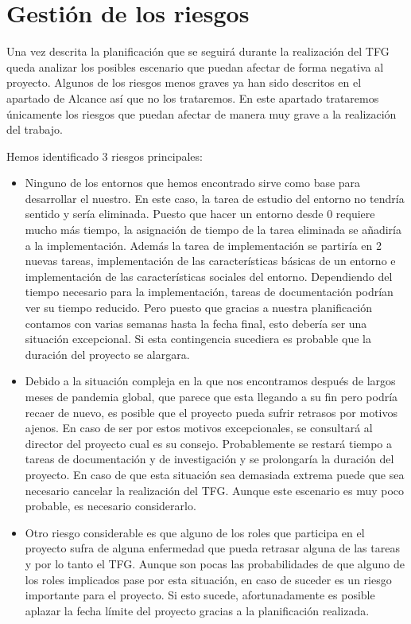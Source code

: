 \section{Gestión de los riesgos}
Una vez descrita la planificación que se seguirá durante la realización del TFG queda analizar los posibles escenario que puedan afectar de forma negativa al proyecto. Algunos de los riesgos menos graves ya han sido descritos en el apartado de Alcance así que no los trataremos. En este apartado trataremos únicamente los riesgos que puedan afectar de manera muy grave a la realización del trabajo.  

Hemos identificado 3 riesgos principales:
\begin{itemize}
    \item Ninguno de los entornos que hemos encontrado sirve como base para desarrollar el nuestro. En este caso, la tarea de estudio del entorno no tendría sentido y sería eliminada. Puesto que hacer un entorno desde 0 requiere mucho más tiempo, la asignación de tiempo de la tarea eliminada se añadiría a la implementación. Además la tarea de implementación se partiría en 2 nuevas tareas, implementación de las características básicas de un entorno e implementación de las características sociales del entorno. Dependiendo del tiempo necesario para la implementación, tareas de documentación podrían ver su tiempo reducido. Pero puesto que gracias a nuestra planificación contamos con varias semanas hasta la fecha final, esto debería ser una situación excepcional. Si esta contingencia sucediera es probable que la duración del proyecto se alargara.
    
    \item Debido a la situación compleja en la que nos encontramos después de largos meses de pandemia global, que parece que esta llegando a su fin pero podría recaer de nuevo, es posible que el proyecto pueda sufrir retrasos por motivos ajenos. En caso de ser por estos motivos excepcionales, se consultará al director del proyecto cual es su consejo. Probablemente se restará tiempo a tareas de documentación y de investigación y se prolongaría la duración del proyecto. En caso de que esta situación sea demasiada extrema puede que sea necesario cancelar la realización del TFG. Aunque este escenario es muy poco probable, es necesario considerarlo.
    
    \item Otro riesgo considerable es que alguno de los roles que participa en el proyecto sufra de alguna enfermedad que pueda retrasar alguna de las tareas y por lo tanto el TFG. Aunque son pocas las probabilidades de que alguno de los roles implicados pase por esta situación, en caso de suceder es un riesgo importante para el proyecto. Si esto sucede, afortunadamente es posible aplazar la fecha límite del proyecto gracias a la planificación realizada.
\end{itemize}